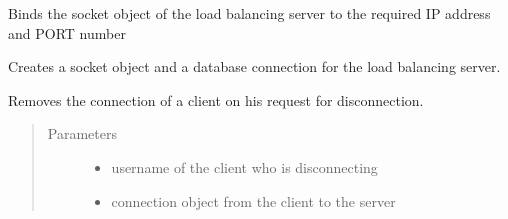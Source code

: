 \documentclass[letterpaper,10pt,english]{sphinxmanual}
\begin{document}
\begin{fulllineitems}
\label{\detokenize{main_server:main_server.bindSocket}}
Binds the socket object of the load balancing server to the required IP address and PORT number

\end{fulllineitems}


\begin{fulllineitems}
\label{\detokenize{main_server:main_server.createServer}}
Creates a socket object and a database connection for the load balancing server.

\end{fulllineitems}


\begin{fulllineitems}
\label{\detokenize{main_server:main_server.disconnect}}
Removes the connection of a client on his request for disconnection.
\begin{quote}\begin{description}
\item[{Parameters}] \leavevmode\begin{itemize}
\item {} 
 \textendash{} username of the client who is disconnecting

\item {} 
 \textendash{} connection object from the client to the server

\end{itemize}

\end{description}\end{quote}

\end{fulllineitems}

\end{document}
